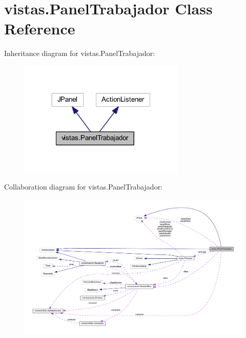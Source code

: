 \hypertarget{classvistas_1_1_panel_trabajador}{}\section{vistas.\+Panel\+Trabajador Class Reference}
\label{classvistas_1_1_panel_trabajador}


Inheritance diagram for vistas.\+Panel\+Trabajador\+:
\nopagebreak
\begin{figure}[H]
\begin{center}
\leavevmode
\includegraphics[width=224pt]{classvistas_1_1_panel_trabajador__inherit__graph}
\end{center}
\end{figure}


Collaboration diagram for vistas.\+Panel\+Trabajador\+:
\nopagebreak
\begin{figure}[H]
\begin{center}
\leavevmode
\includegraphics[width=350pt]{classvistas_1_1_panel_trabajador__coll__graph}
\end{center}
\end{figure}

